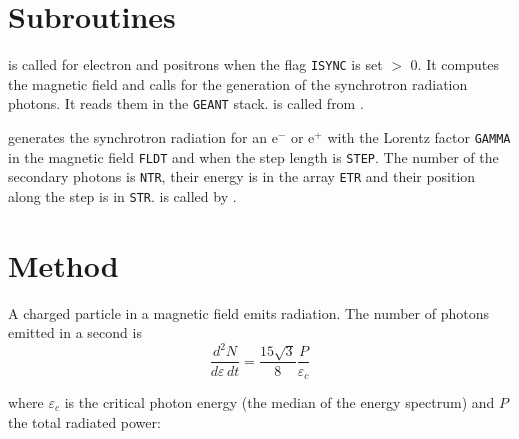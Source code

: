  
\section{Subroutines}

 is called for electron and positrons
when the flag {\tt ISYNC} is set $>$ 0. It 
computes the magnetic field and calls
 for the generation of the synchrotron radiation
photons. It reads them in the {\tt GEANT} stack.
 is called from .

 generates the synchrotron radiation 
for an e$^-$ or e$^+$ with the Lorentz factor {\tt GAMMA}
in the magnetic field {\tt FLDT} and when the step
length is {\tt STEP}. The number of the secondary
photons is {\tt NTR}, their energy is in the array {\tt ETR} and
their position along the step is in {\tt STR}.
 is called by .


\section{Method}
A charged particle in a magnetic field emits radiation.
The number of photons emitted in a second is
\begin{equation}
\frac{d^2 \! N}{d\varepsilon \, dt} = \frac{15 \sqrt{3}}{8} \frac{P}{\varepsilon_c}
\end{equation}

where $\varepsilon_c$ is the critical photon energy
(the median of the energy spectrum) and $P$ the
total radiated power:

